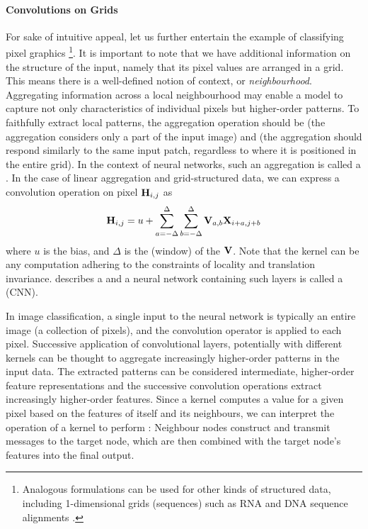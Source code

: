 \documentclass[
	fontsize=10pt, %
	twoside=false, %
	secnumdepth=1, %
  toc=indentunnumbered %
]{kaobook}
\begin{document}
\paragraph{Convolutions on Grids}
For sake of intuitive appeal, let us further entertain the example of
classifying pixel graphics
\footnote{
  Analogous formulations can be used for other kinds of structured data,
  including 1-dimensional grids (sequences) such as RNA and DNA sequence alignments
  \cite{flagel_UnreasonableEffectivenessConvolutional_2019}\cite{aoki_ConvolutionalNeuralNetworks_2018}.
}. It is important to note that we have additional
information on the structure of the input,
namely that its pixel values are arranged in a grid. This means there is a
well-defined notion of context, or \textit{neighbourhood}.
%
Aggregating information across a local neighbourhood may enable
a model to capture not only characteristics of individual pixels but
higher-order patterns. To faithfully extract local patterns, the aggregation
operation should be  (the aggregation considers only a part of the
input image) and  (the aggregation should respond
similarly to the same input patch, regardless to where it is positioned in the
entire grid). In the context of neural networks, such an aggregation is called a
 \cite{zhang_dive_nodate}. In the case of linear aggregation
and grid-structured data, we can express a convolution operation on pixel $\mathbf{H}_{i,j}$ as
\begin{align}
  \mathbf{H}_{i,j} = u + \sum_{a= -\Delta}^\Delta \sum_{b = -\Delta}^\Delta \mathbf{V}_{a,b} \mathbf{X}_{i+a,j+b}
  \label{eq:convolution}
\end{align}
where $u$ is the bias, and $\Delta$ is the (window)  of the
 $\mathbf{V}$.
%
Note that the kernel can be any
computation adhering to the constraints of locality and translation invariance.
%
 describes a
 and a neural network containing such layers is called
a  (CNN).

In image classification, a single input to the neural network is typically an
entire image (a collection of pixels), and the convolution operator is applied
to each pixel. 
%
Successive application of convolutional layers,
potentially with different kernels can be thought to aggregate increasingly
higher-order patterns in the input data. The extracted patterns can be
considered intermediate, higher-order feature representations and the successive
convolution operations extract increasingly higher-order features.
%
Since a kernel computes a value for a given pixel based on the features of
itself and its neighbours, we can interpret the operation of a kernel to perform
: Neighbour nodes construct and transmit messages to the
target node, which are then combined with the target node's features into the
final output.
\end{document}
